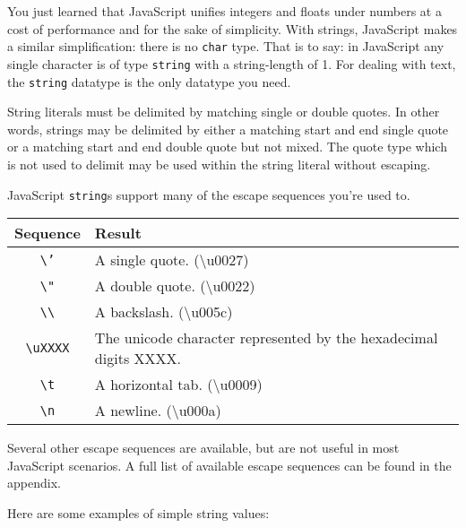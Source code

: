 \documentclass[11pt,letter]{book}
\begin{document}
    You just learned that JavaScript unifies integers and floats under numbers at a cost of 
    performance and for the sake of simplicity. With strings, JavaScript makes a similar 
    simplification: there is no \texttt{char} type. That is to say: in JavaScript any single 
    character is of type \texttt{string} with a string-length of 1. For dealing with  
    text, the \texttt{string} datatype is the only datatype you need.
    
    String literals must be delimited by matching single or double quotes. In other words, strings 
    may be delimited by either a matching start and end single quote or a matching start and end 
    double quote but not mixed. The quote type which is not used to delimit may be used within the 
    string literal without escaping.
    
    JavaScript \texttt{string}s support many of the escape sequences you're used to.
    
    \vspace{10pt}
    \small{
        \begin{tabular}{c|l}
            Sequence & Result \\
            \hline
            \texttt{\textbackslash{'}}  & A single quote. (\textbackslash{u0027}) \\
            \texttt{\textbackslash{"}}  & A double quote. (\textbackslash{u0022}) \\
            \texttt{\textbackslash\textbackslash} 
                                        & A backslash. (\textbackslash{u005c}) \\
            \texttt{\textbackslash{uXXXX}}
                                        & The unicode character represented by the hexadecimal
                                            digits XXXX. \\
            \texttt{\textbackslash{t}}  & A horizontal tab. (\textbackslash{u0009}) \\
            \texttt{\textbackslash{n}}  & A newline. (\textbackslash{u000a}) \\
        \end{tabular}
    }
    \vspace{10pt}
    
    Several other escape sequences are available, but are not useful in most JavaScript scenarios. 
    A full list of available escape sequences can be found in the appendix.
    
    Here are some examples of simple string values:
    
\end{document}
